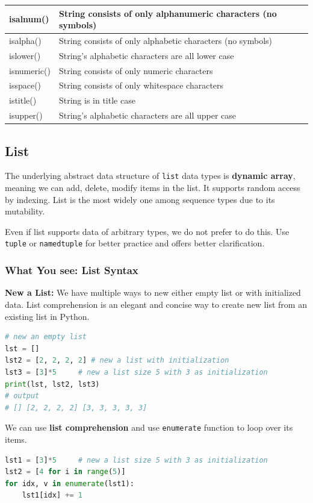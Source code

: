 \documentclass[../main.tex]{subfiles}
\begin{document}
\begin{table}[!ht]
\begin{small}
\begin{tabular}{|p{}|p{}| }
isalnum() &	String consists of only alphanumeric characters (no symbols)\\ \hline
isalpha() &	String consists of only alphabetic characters (no symbols)\\ \hline
islower() &	String's alphabetic characters are all lower case\\ \hline
isnumeric() & String consists of only numeric characters\\ \hline
isspace() &	String consists of only whitespace characters\\ \hline
istitle() &	String is in title case\\ \hline
isupper() &	String's alphabetic characters are all upper case\\ \hline
\end{tabular}
  \label{tab:common_operation_string_boolean}
  \end{small}
\end{table}



\subsection{List}
The underlying abstract data structure of \texttt{list} data types is \textbf{dynamic array}, meaning we can add, delete, modify items in the list. It supports random access by indexing.  List is the most widely one among sequence types due to its mutability. 

 Even if list supports data of arbitrary types, we do not prefer to do this. Use \texttt{tuple} or \texttt{namedtuple} for better practice and offers better clarification. 
\subsubsection{What You see: List Syntax}
\textbf{New a List:} We have multiple ways to new either empty list or with initialized data. List comprehension is an elegant and concise way to create new list from an existing list in Python.
\begin{lstlisting}[language = Python]
# new an empty list
lst = []
lst2 = [2, 2, 2, 2] # new a list with initialization
lst3 = [3]*5     # new a list size 5 with 3 as initialization
print(lst, lst2, lst3)
# output
# [] [2, 2, 2, 2] [3, 3, 3, 3, 3] 
\end{lstlisting}

We can use \textbf{list comprehension} and use \texttt{enumerate} function to loop over its items.
\begin{lstlisting}[language=Python]
lst1 = [3]*5     # new a list size 5 with 3 as initialization
lst2 = [4 for i in range(5)]
for idx, v in enumerate(lst1):
    lst1[idx] += 1
\end{lstlisting}
\end{document}
